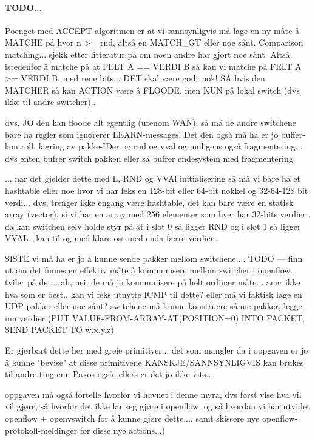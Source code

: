 \paragraph{TODO...}

Poenget med ACCEPT-algoritmen er at vi sannsynligvis må lage en ny måte å
MATCHE på hvor n >= rnd, altså en MATCH\_{}GT eller noe sånt.  Comparison
matching... sjekk etter litteratur på om noen andre har gjort noe sånt.
Altså, istedenfor å matche på at FELT A == VERDI B så kan vi matche på FELT
A >= VERDI B, med rene bits... DET skal være godt nok!  SÅ hvis den MATCHER
så kan ACTION være å FLOODE, men KUN på lokal switch (dvs ikke til andre
switcher)..

dvs, JO den kan floode alt egentlig (utenom WAN), så må de
andre switchene bare ha regler som ignorerer LEARN-messages! Det den også må
ha er jo buffer-kontroll, lagring av pakke-IDer og rnd og vval og muligens
også fragmentering...  dvs enten bufrer switch pakken eller så bufrer
endesystem med fragmentering

... når det gjelder dette med L, RND og VVAl initialisering så må vi bare ha
et hashtable eller noe hvor vi har feks en 128-bit eller 64-bit nøkkel og
32-64-128 bit verdi... dvs, trenger ikke engang være hashtable, det kan bare
være en statisk array (vector), si vi har en array med 256 elementer som
hver har 32-bits verdier.. da kan switchen selv holde styr på at i slot 0 så
ligger RND og i slot 1 så ligger VVAL.. kan til og med klare oss med enda
færre verdier..

SISTE vi må ha er jo å kunne sende pakker mellom switchene....
TODO --- finn ut om det finnes en effektiv måte å kommunisere mellom
switcher i openflow.. tviler på det... ah, nei, de må jo kommunisere på helt
ordinær måte... aner ikke hva som er best.. kan vi feks utnytte ICMP til
dette? eller må vi faktisk lage en UDP pakker eller noe sånt?
switchene må kunne konstruere sånne pakker, legge inn verdier
(PUT VALUE-FROM-ARRAY-AT(POSITION=0) INTO PACKET, SEND PACKET TO w.x.y.z)

Er gjørbart dette her med greie primitiver... det som mangler da i oppgaven
er jo å kunne "bevise" at disse primitivene KANSKJE/SANNSYNLIGVIS kan brukes
til andre ting enn Paxos også, ellers er det jo ikke vits..

oppgaven må også fortelle hvorfor vi havnet i denne myra, dvs først vise hva
vil vil gjøre, så hvorfor det ikke lar seg gjøre i openflow, og så hvordan
vi har utvidet openflow + openvswitch for å kunne gjøre dette....
samt skissere nye openflow-protokoll-meldinger for disse nye actions...)

